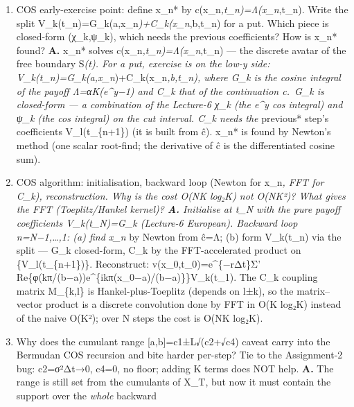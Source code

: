 \documentclass[
  11pt,
]{article}
\begin{document}
\begin{enumerate}
  φ) gives ĉ(x,t\_\{n−1\})=e\^{}\{−rΔt\}Σ'\_\{k\}
  Re\{φ(kπ/(b−a))e\^{}\{ikπ(x−a)/(b−a)\}\}V\_k(t\_n). Here
  V\_k(t\_n)=(2/(b−a))∫\_a\^{}b v(y,t\_n)cos(kπ(y−a)/(b−a))dy are the
  cosine coefficients of the option \emph{value} at t\_n.~At t\_N they
  are exactly the Lecture-6 European payoff coefficients; for
  n\textless N they are built recursively --- so it is a backward
  recursion on the coefficient vector, not on a price grid.
\item
  COS early-exercise point: define x\_n* by
  c(x\_n\emph{,t\_n)=Λ(x\_n},t\_n). Write the split
  V\_k(t\_n)=G\_k(a,x\_n\emph{)+C\_k(x\_n},b,t\_n) for a put. Which
  piece is closed-form (χ\_k,ψ\_k), which needs the previous
  coefficients? How is x\_n* found? \textbf{A.} x\_n* solves
  c(x\_n\emph{,t\_n)=Λ(x\_n},t\_n) --- the discrete avatar of the free
  boundary S\emph{(t). For a put, exercise is on the low-y side:
  V\_k(t\_n)=G\_k(a,x\_n})+C\_k(x\_n\emph{,b,t\_n), where G\_k is the
  cosine integral of the payoff Λ=αK(e\^{}y−1) and C\_k that of the
  continuation c.~G\_k is closed-form --- a combination of the Lecture-6
  χ\_k (the e\^{}y cos integral) and ψ\_k (the cos integral) on the cut
  interval. C\_k needs the }previous* step's coefficients
  V\_l(t\_\{n+1\}) (it is built from ĉ). x\_n* is found by Newton's
  method (one scalar root-find; the derivative of ĉ is the
  differentiated cosine sum).
\item
  COS algorithm: initialisation, backward loop (Newton for x\_n\emph{,
  FFT for C\_k), reconstruction. Why is the cost O(NK log₂K) not O(NK²)?
  What gives the FFT (Toeplitz/Hankel kernel)? \textbf{A.} Initialise at
  t\_N with the pure payoff coefficients V\_k(t\_N)=G\_k (Lecture-6
  European). Backward loop n=N−1,\ldots,1: (a) find x\_n} by Newton from
  ĉ=Λ; (b) form V\_k(t\_n) via the split --- G\_k closed-form, C\_k by
  the FFT-accelerated product on \{V\_l(t\_\{n+1\})\}. Reconstruct:
  v(x\_0,t\_0)=e\^{}\{−rΔt\}Σ'
  Re\{φ(kπ/(b−a))e\^{}\{ikπ(x\_0−a)/(b−a)\}\}V\_k(t\_1). The C\_k
  coupling matrix M\_\{k,l\} is Hankel-plus-Toeplitz (depends on l±k),
  so the matrix--vector product is a discrete convolution done by FFT in
  O(K log₂K) instead of the naive O(K²); over N steps the cost is O(NK
  log₂K).
\item
  Why does the cumulant range {[}a,b{]}=c1±L√(c2+√c4) caveat carry into
  the Bermudan COS recursion and bite harder per-step? Tie to the
  Assignment-2 bug: c2=σ²Δt→0, c4=0, no floor; adding K terms does NOT
  help. \textbf{A.} The range is still set from the cumulants of X\_T,
  but now it must contain the support over the \emph{whole} backward

\end{enumerate}
\end{document}
